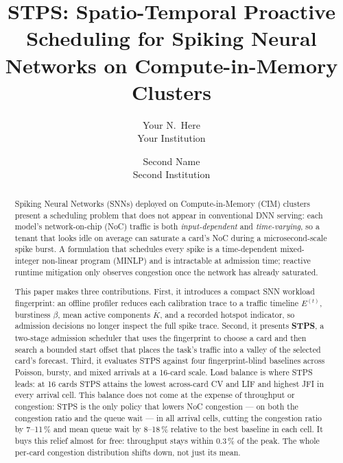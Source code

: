 \documentclass[letterpaper,twocolumn,10pt]{article}
\begin{document}

\date{}

\title{\Large \bf STPS: Spatio-Temporal Proactive Scheduling for Spiking Neural Networks on Compute-in-Memory Clusters}

\author{
{\rm Your N.\ Here}\\
Your Institution
\and
{\rm Second Name}\\
Second Institution
} %

\maketitle

\begin{abstract}
Spiking Neural Networks (SNNs) deployed on Compute-in-Memory (CIM) clusters present a scheduling problem that does not appear in conventional DNN serving: each model's network-on-chip (NoC) traffic is both \emph{input-dependent} and \emph{time-varying}, so a tenant that looks idle on average can saturate a card's NoC during a microsecond-scale spike burst. A formulation that schedules every spike is a time-dependent mixed-integer non-linear program (MINLP) and is intractable at admission time; reactive runtime mitigation only observes congestion once the network has already saturated.

This paper makes three contributions. First, it introduces a compact SNN workload fingerprint: an offline profiler reduces each calibration trace to a traffic timeline $E^{(t)}$, burstiness $\beta$, mean active components $\overline{K}$, and a recorded hotspot indicator, so admission decisions no longer inspect the full spike trace. Second, it presents \textbf{STPS}, a two-stage admission scheduler that uses the fingerprint to choose a card and then search a bounded start offset that places the task's traffic into a valley of the selected card's forecast. Third, it evaluates STPS against four fingerprint-blind baselines across Poisson, bursty, and mixed arrivals at a 16-card scale. Load balance is where STPS leads: at 16 cards STPS attains the lowest across-card CV and LIF and highest JFI in every arrival cell. This balance does not come at the expense of throughput or congestion: STPS is the only policy that lowers NoC congestion --- on both the congestion ratio and the queue wait --- in all arrival cells, cutting the congestion ratio by 7--11\,\% and mean queue wait by 8--18\,\% relative to the best baseline in each cell. It buys this relief almost for free: throughput stays within 0.3\,\% of the peak. The whole per-card congestion distribution shifts down, not just its mean.
\end{abstract}
\end{document}
